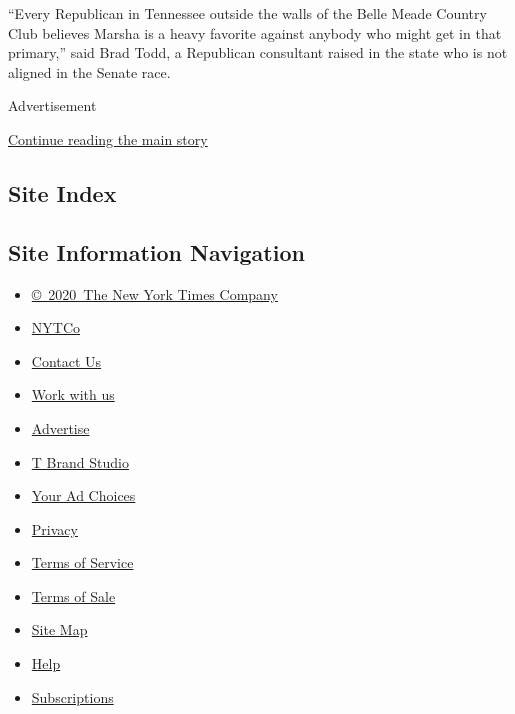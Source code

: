 ``Every Republican in Tennessee outside the walls of the Belle Meade
Country Club believes Marsha is a heavy favorite against anybody who
might get in that primary,'' said Brad Todd, a Republican consultant
raised in the state who is not aligned in the Senate race.

Advertisement

\protect\hyperlink{after-bottom}{Continue reading the main story}

\hypertarget{site-index}{%
\subsection{Site Index}\label{site-index}}

\hypertarget{site-information-navigation}{%
\subsection{Site Information
Navigation}\label{site-information-navigation}}

\begin{itemize}
\tightlist
\item
  \href{https://help.nytimes3xbfgragh.onion/hc/en-us/articles/115014792127-Copyright-notice}{©~2020~The
  New York Times Company}
\end{itemize}

\begin{itemize}
\tightlist
\item
  \href{https://www.nytco.com/}{NYTCo}
\item
  \href{https://help.nytimes3xbfgragh.onion/hc/en-us/articles/115015385887-Contact-Us}{Contact
  Us}
\item
  \href{https://www.nytco.com/careers/}{Work with us}
\item
  \href{https://nytmediakit.com/}{Advertise}
\item
  \href{http://www.tbrandstudio.com/}{T Brand Studio}
\item
  \href{https://www.nytimes3xbfgragh.onion/privacy/cookie-policy\#how-do-i-manage-trackers}{Your
  Ad Choices}
\item
  \href{https://www.nytimes3xbfgragh.onion/privacy}{Privacy}
\item
  \href{https://help.nytimes3xbfgragh.onion/hc/en-us/articles/115014893428-Terms-of-service}{Terms
  of Service}
\item
  \href{https://help.nytimes3xbfgragh.onion/hc/en-us/articles/115014893968-Terms-of-sale}{Terms
  of Sale}
\item
  \href{https://spiderbites.nytimes3xbfgragh.onion}{Site Map}
\item
  \href{https://help.nytimes3xbfgragh.onion/hc/en-us}{Help}
\item
  \href{https://www.nytimes3xbfgragh.onion/subscription?campaignId=37WXW}{Subscriptions}
\end{itemize}
